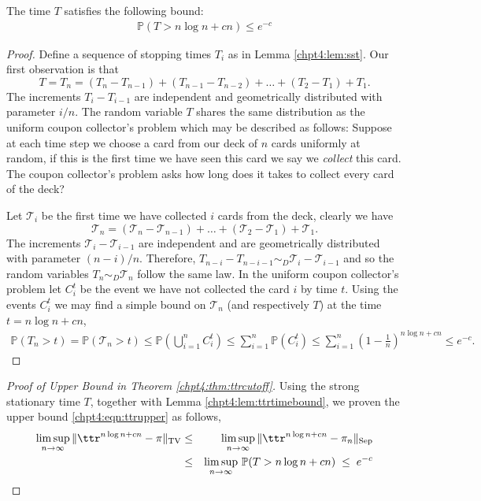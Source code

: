 \documentclass[11pt]{report}
\begin{document}
\begin{lemma}
	\label{chpt4:lem:ttrtimebound}
	The time $T$ satisfies the following bound: 
	\begin{eqnarray}
	\mathbb{P}(T> n\log n +cn) \leq e^{-c}
	\end{eqnarray} 
\end{lemma}
\begin{proof}
	Define a sequence of stopping times $T_{i}$ as in Lemma \ref{chpt4:lem:sst}. Our first observation is that
	\[T  = T_{n}= (T_{n} - T_{n-1}) + (T_{n-1}- T_{n-2}) + \dots + (T_{2} -T_{1}) + 
	T_{1}.\]
	The increments $T_{i} - T_{i-1}$ are independent and geometrically 
	distributed with parameter $i/n$. The random variable $T$ shares the same distribution as the uniform coupon collector's problem which may be described as follows:
	Suppose at each time step we choose a card from our deck of $n$ cards uniformly at random, if this 
	is the first time we have seen this card we say we \emph{collect} this 
	card. The coupon collector's problem asks how long does it takes to 
	collect every card of the deck?	
	
	
	
	Let 
	$\mathcal{T}_{i}$ be the first time we have collected $i$ cards from the deck, 
	clearly we have
	\[\mathcal{T}_{n} = (\mathcal{T}_{n}-\mathcal{T}_{n-1}) + \dots + 
	(\mathcal{T}_{2}-\mathcal{T}_{1}) + \mathcal{T}_{1}.\]
	The increments $\mathcal{T}_{i} - \mathcal{T}_{i-1}$ are independent 
	and are geometrically distributed with parameter $(n-i)/n$.
	Therefore, $T_{n-i} - T_{n-i-1} \sim_{D} \mathcal{T}_{i} - 
	\mathcal{T}_{i-1}$ and so the random variables $T_{n} \sim_{D} \mathcal{T}_{n}$ 
	follow the same law.
	In the uniform coupon collector's problem let $C_{i}^{t}$ be the event 
	we have not collected the card $i$ by time $t$. Using the events $C_{i}^{t}$ we 
	may find a simple bound on $\mathcal{T}_{n}$ (and respectively $T$) at 
	the time $ t= n\log n +cn$,
	\begin{eqnarray}
	\mathbb{P}(T_{n} >t) = 
	\mathbb{P}(\mathcal{T}_{n} >t)  \leq  \mathbb{P} 
	\left(\bigcup_{i=1}^{n} C_{i}^{t} \right) 
	\leq  \sum_{i=1}^{n} \mathbb{P}(C_{i}^{t}) \leq \sum_{i=1}^{n} 
	\left( 1- \frac{1}{n}\right)^{n\log n +cn} \leq e^{-c}. \label{chpt4:eqn:classiccoupon}
	\end{eqnarray}
\end{proof}


\begin{proof}[Proof of Upper Bound in Theorem \ref{chpt4:thm:ttrcutoff}]
	Using the strong stationary time $T$, together with Lemma \ref{chpt4:lem:ttrtimebound}, we proven the upper bound \eqref{chpt4:eqn:ttrupper} as follows,
	\begin{eqnarray*}
		\limsup_{n\to\infty} \,\lVert \ttr^{n \log n +cn} -\pi \rVert_{\tiny 
			\textnormal{TV}} & \leq &\limsup_{n\to\infty} \, \lVert 
		\ttr^{n \log n +cn} -\pi_{n} \rVert_{\textnormal{Sep}}\\ 
		&\leq & \limsup_{n\to\infty}\, \mathbb{P}(T > 
		n\log n +cn ) \; \leq \; e^{-c} \qedhere
	\end{eqnarray*}
\end{proof}
\end{document}
